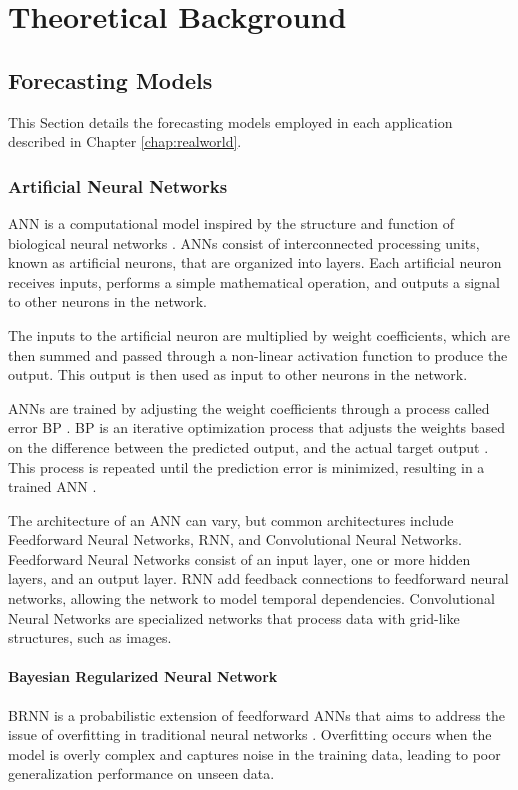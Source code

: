 \chapter{Theoretical Background} \label{chap:theoretical}

\section{Forecasting Models}
This Section details the forecasting models employed in each application described in Chapter \ref{chap:realworld}.


\subsection{Artificial Neural Networks}
\ac{ANN} is a computational model inspired by the structure and function of biological neural networks \cite{haykin1999Neural}. \ac{ANN}s consist of interconnected processing units, known as artificial neurons, that are organized into layers. Each artificial neuron receives inputs, performs a simple mathematical operation, and outputs a signal to other neurons in the network.

The inputs to the artificial neuron are multiplied by weight coefficients, which are then summed and passed through a non-linear activation function to produce the output. This output is then used as input to other neurons in the network.

\ac{ANN}s are trained by adjusting the weight coefficients through a process called error \ac{BP} \cite{bengio2016Deep}. \ac{BP} is an iterative optimization process that adjusts the weights based on the difference between the predicted output, and the actual target output \cite{haykin1999Neural}. This process is repeated until the prediction error is minimized, resulting in a trained \ac{ANN} \cite{bengio2016Deep}.

The architecture of an \ac{ANN} can vary, but common architectures include Feedforward Neural Networks, \ac{RNN}, and Convolutional Neural Networks. Feedforward Neural Networks consist of an input layer, one or more hidden layers, and an output layer. \ac{RNN} add feedback connections to feedforward neural networks, allowing the network to model temporal dependencies. Convolutional Neural Networks are specialized networks that process data with grid-like structures, such as images.

\subsubsection{Bayesian Regularized Neural Network}
\ac{BRNN} is a probabilistic extension of feedforward \ac{ANN}s that aims to address the issue of overfitting in traditional neural networks \cite{mackay1992Bayesian}. Overfitting occurs when the model is overly complex and captures noise in the training data, leading to poor generalization performance on unseen data.


